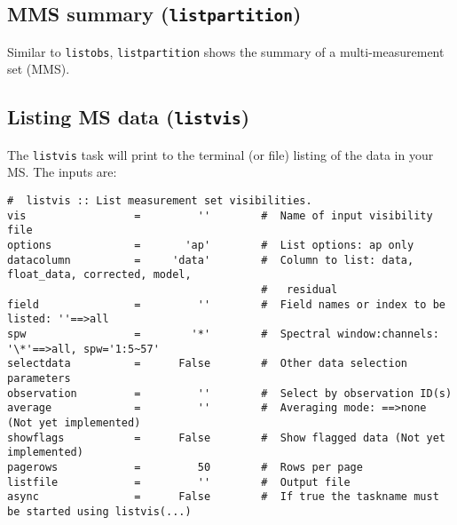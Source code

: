 \subsection{MMS summary ({\tt listpartition})}
\label{section:io.vis.listpartition}
Similar to {\tt listobs}, {\tt listpartition} shows the summary of a
multi-measurement set (MMS).


\subsection{Listing MS data ({\tt listvis})}
\label{section:io.vis.listvis}

The {\tt listvis} task will print to the terminal (or file) listing
of the data in your MS.
The inputs are:
\small
\begin{verbatim}
#  listvis :: List measurement set visibilities.
vis                 =         ''        #  Name of input visibility file
options             =       'ap'        #  List options: ap only
datacolumn          =     'data'        #  Column to list: data, float_data, corrected, model,
                                        #   residual
field               =         ''        #  Field names or index to be listed: ''==>all
spw                 =        '*'        #  Spectral window:channels: '\*'==>all, spw='1:5~57'
selectdata          =      False        #  Other data selection parameters
observation         =         ''        #  Select by observation ID(s)
average             =         ''        #  Averaging mode: ==>none (Not yet implemented)
showflags           =      False        #  Show flagged data (Not yet implemented)
pagerows            =         50        #  Rows per page
listfile            =         ''        #  Output file
async               =      False        #  If true the taskname must be started using listvis(...)
\end{verbatim}
\normalsize

